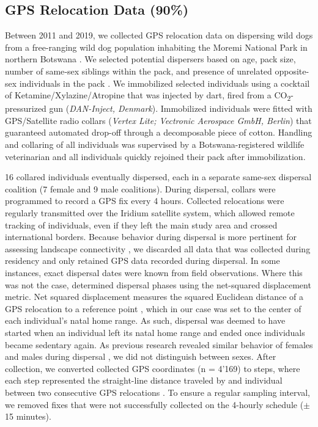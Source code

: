 \documentclass[abstract=on,10pt,a4paper,bibliography=totocnumbered]{article}
\begin{document}
\subsection{GPS Relocation Data (90\%)}
Between 2011 and 2019, we collected GPS relocation data on dispersing wild dogs
from a free-ranging wild dog population inhabiting the Moremi National Park in
northern Botswana \citep{Cozzi.2020, Hofmann.2021}. We selected potential
dispersers based on age, pack size, number of same‐sex siblings within the pack,
and presence of unrelated opposite-sex individuals in the pack
\citep{McNutt.1996, Behr.2020}. We immobilized selected individuals using a
cocktail of Ketamine/Xylazine/Atropine \citep{Osofsky.1996, Cozzi.2020} that was
injected by dart, fired from a CO\textsubscript{2}-pressurized gun
(\textit{DAN-Inject, Denmark}). Immobilized individuals were fitted with
GPS/Satellite radio collars (\textit{Vertex Lite; Vectronic Aerospace GmbH,
Berlin}) that guaranteed automated drop-off through a decomposable piece of
cotton. Handling and collaring of all individuals was supervised by a
Botswana-registered wildlife veterinarian and all individuals quickly rejoined
their pack after immobilization.

16 collared individuals eventually dispersed, each in a separate same-sex
dispersal coalition (7 female and 9 male coalitions). During dispersal, collars
were programmed to record a GPS fix every 4 hours. Collected relocations were
regularly transmitted over the Iridium satellite system, which allowed remote
tracking of individuals, even if they left the main study area and crossed
international borders. Because behavior during dispersal is more pertinent for
assessing landscape connectivity \citep{Elliot.2014, Abrahms.2017}, we discarded
all data that was collected during residency and only retained GPS data recorded
during dispersal. In some instances, exact dispersal dates were known from field
observations. Where this was not the case, determined dispersal phases using the
net-squared displacement metric. Net squared displacement measures the squared
Euclidean distance of a GPS relocation to a reference point \citep{Borger.2012},
which in our case was set to the center of each individual's natal home range.
As such, dispersal was deemed to have started when an individual left its natal
home range and ended once individuals became sedentary again. As previous
research revealed similar behavior of females and males during dispersal
\citep{Woodroffe.2019, Cozzi.2020}, we did not distinguish between sexes. After
collection, we converted collected GPS coordinates (n = 4'169) to steps, where
each step represented the straight-line distance traveled by and individual
between two consecutive GPS relocations \citep{Turchin.1998}. To ensure a
regular sampling interval, we removed fixes that were not successfully collected
on the 4-hourly schedule (\( \pm \) 15 minutes).
\end{document}
